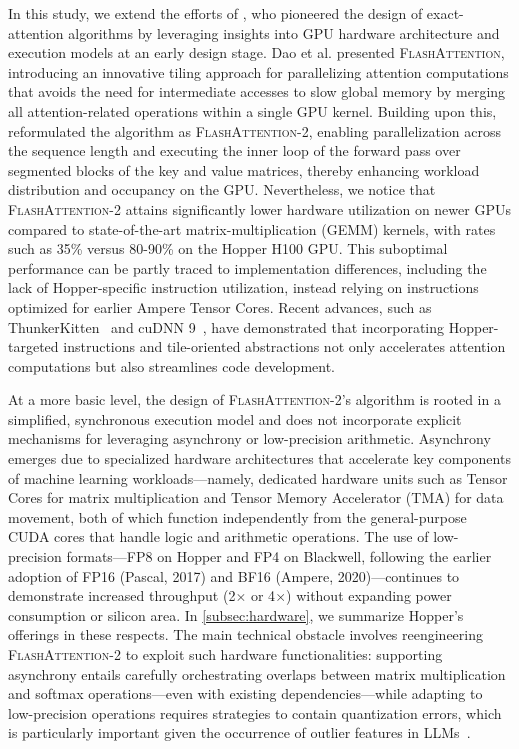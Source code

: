 In this study, we extend the efforts of \citet{dao2022flashattention}, who pioneered the design of exact-attention algorithms by leveraging insights into GPU hardware architecture and execution models at an early design stage. Dao et al. \citep{dao2022flashattention} presented \textsc{FlashAttention}, introducing an innovative tiling approach for parallelizing attention computations that avoids the need for intermediate accesses to slow global memory by merging all attention-related operations within a single GPU kernel. Building upon this, \citet{dao2023flashattention2} reformulated the algorithm as \textsc{FlashAttention-2}, enabling parallelization across the sequence length and executing the inner loop of the forward pass over segmented blocks of the key and value matrices, thereby enhancing workload distribution and occupancy on the GPU. Nevertheless, we notice that \textsc{FlashAttention-2} attains significantly lower hardware utilization on newer GPUs compared to state-of-the-art matrix-multiplication (GEMM) kernels, with rates such as 35\% versus 80-90\% on the Hopper H100 GPU. This suboptimal performance can be partly traced to implementation differences, including the lack of Hopper-specific instruction utilization, instead relying on instructions optimized for earlier Ampere Tensor Cores. Recent advances, such as ThunkerKitten~\citep{spector2024thunder} and cuDNN 9~\citep{cudnn9}, have demonstrated that incorporating Hopper-targeted instructions and tile-oriented abstractions not only accelerates attention computations but also streamlines code development.

At a more basic level, the design of \textsc{FlashAttention-2}'s algorithm is rooted in a simplified, synchronous execution model and does not incorporate explicit mechanisms for leveraging asynchrony or low-precision arithmetic. Asynchrony emerges due to specialized hardware architectures that accelerate key components of machine learning workloads—namely, dedicated hardware units such as Tensor Cores for matrix multiplication and Tensor Memory Accelerator (TMA) for data movement, both of which function independently from the general-purpose CUDA cores that handle logic and arithmetic operations. The use of low-precision formats—FP8 on Hopper and FP4 on Blackwell, following the earlier adoption of FP16 (Pascal, 2017) and BF16 (Ampere, 2020)—continues to demonstrate increased throughput (2$\times$ or 4$\times$) without expanding power consumption or silicon area. In \cref{subsec:hardware}, we summarize Hopper's offerings in these respects. 
The main technical obstacle involves reengineering \textsc{FlashAttention-2} to exploit such hardware functionalities: supporting asynchrony entails carefully orchestrating overlaps between matrix multiplication and softmax operations—even with existing dependencies—while adapting to low-precision operations requires strategies to contain quantization errors, which is particularly important given the occurrence of outlier features in LLMs~\citep{dettmers2208llm, sun2024massive}.

